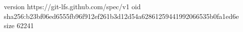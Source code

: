 version https://git-lfs.github.com/spec/v1
oid sha256:b23bf06ed6555fb96f912ef261b3d12d54a62861259441992066535b0fa1ed6e
size 62241
